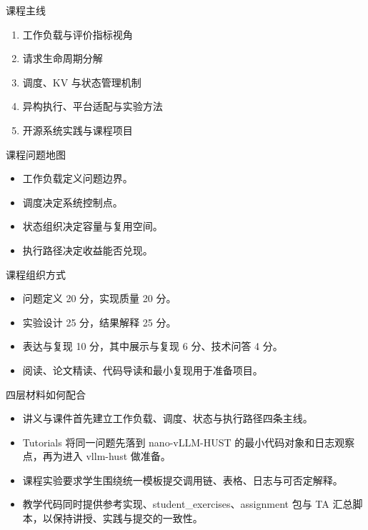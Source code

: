 \begin{frame}{课程主线}
  \begin{enumerate}
    \item 工作负载与评价指标视角
    \item 请求生命周期分解
    \item 调度、KV 与状态管理机制
    \item 异构执行、平台适配与实验方法
    \item 开源系统实践与课程项目
  \end{enumerate}
\end{frame}

\begin{frame}{课程问题地图}
  \begin{itemize}
    \item 工作负载定义问题边界。
    \item 调度决定系统控制点。
    \item 状态组织决定容量与复用空间。
    \item 执行路径决定收益能否兑现。
  \end{itemize}
\end{frame}

\begin{frame}{课程组织方式}
  \begin{itemize}
    \item 问题定义 20 分，实现质量 20 分。
    \item 实验设计 25 分，结果解释 25 分。
    \item 表达与复现 10 分，其中展示与复现 6 分、技术问答 4 分。
    \item 阅读、论文精读、代码导读和最小复现用于准备项目。
  \end{itemize}
\end{frame}

\begin{frame}{四层材料如何配合}
  \begin{itemize}
    \item 讲义与课件首先建立工作负载、调度、状态与执行路径四条主线。
    \item Tutorials 将同一问题先落到 nano-vLLM-HUST 的最小代码对象和日志观察点，再为进入 vllm-hust 做准备。
    \item 课程实验要求学生围绕统一模板提交调用链、表格、日志与可否定解释。
    \item 教学代码同时提供参考实现、student\_exercises、assignment 包与 TA 汇总脚本，以保持讲授、实践与提交的一致性。
  \end{itemize}
\end{frame}

